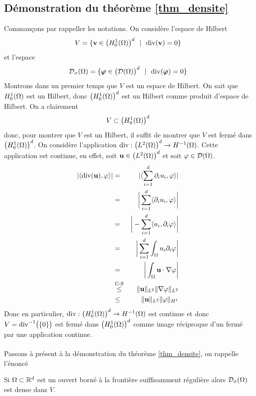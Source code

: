\begin{appendices}
\section{Démonstration du théorème \ref{thm_densite}}\label{AnnexeB}
Commançons par rappeller les notations. On considère l'espace de 
Hilbert 
\begin{equation*}
    V = \{ \bm{\mathrm{v}} \in \big(H^1_0(\Omega)\big)^d \ \ | \ \ \mathrm{div}(\bm{\mathrm{v}})=0\}
\end{equation*}
et l'espace 
\begin{equation*}
    \mathcal{D}_{\sigma}(\Omega) = \{\bm{\mathrm{\varphi}} \in \big(\mathcal{D}(\Omega)\big)^d \ \ | \ \ \mathrm{div}(\bm{\mathrm{\varphi}})=0\}
\end{equation*}
Montrons dans un premier temps que $V$ est un espace de Hilbert. 
On sait que $H^1_0(\Omega)$ est un Hilbert, donc $\big(H^1_0(\Omega)\big)^d$ est 
un Hilbert comme produit d'espace de Hilbert. On a clairement
\begin{equation*}
    V \subset \big(H^1_0(\Omega)\big)^d
\end{equation*}
donc, pour montrer que $V$ est un Hilbert, il suffit de montrer que 
$V$ est fermé dans $\big(H^1_0(\Omega)\big)^d$. On considère l'application 
$\mathrm{div} : \big(L^2(\Omega)\big)^d \rightarrow H^{-1}(\Omega)$. Cette application est continue,
en effet, soit $\bm{\mathrm{u}} \in \big(L^2(\Omega)\big)^d$ et soit $\varphi \in \mathcal{D}(\Omega)$.
\begin{eqnarray*}
    |\langle \mathrm{div}(\bm{\mathrm{u}}),\varphi \rangle| &=& |\langle \sum_{i=1}^d \partial_i u_i , \varphi \rangle| \\
    &=& \bigg|\sum_{i=1}^d \langle \partial_i u_i, \varphi \rangle\bigg| \\
    &=& \bigg|-\sum_{i=1}^d \langle u_i, \partial_i\varphi \rangle\bigg| \\
    &=& \bigg|\sum_{i=1}^d \int_{\Omega} u_i \partial_i\varphi \bigg| \\
    &=& \bigg|\int_{\Omega} \bm{\mathrm{u}}\cdot\nabla \varphi\bigg| \\
    &\overset{\text{C-S}}{\leq}& \|\bm{\mathrm{u}}\|_{L^2}\|\nabla \varphi\|_{L^2} \\
    &\leq& \|\bm{\mathrm{u}}\|_{L^2}\|\varphi \|_{H^1}
\end{eqnarray*} 
Donc en particulier, $\mathrm{div} : \big(H^1_0(\Omega)\big)^d \rightarrow H^{-1}(\Omega)$ est continue et donc 
$V= \mathrm{div}^{-1}\big(\{0\}\big)$ est fermé dans $\big(H^1_0(\Omega)\big)^d$ comme 
image réciproque d'un fermé par une application continue.
\\\\
Passons à présent à la démonstration du théorème \ref{thm_densite}, on rappelle l'énoncé
\begin{theoreme}
    Si $\Omega \subset \mathbb{R}^d$ est un ouvert borné à la frontière
    suiffisamment régulière alors $\mathcal{D}_{\sigma}(\Omega)$
    est dense dans $V$.
\end{theoreme}


\end{appendices}
